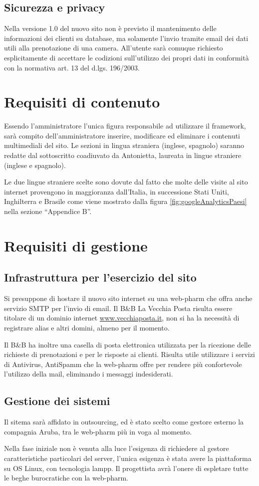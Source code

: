 \documentclass[a4paper,12pt,hidelinks]{report}
\begin{document}
\subsection{Sicurezza e privacy}
Nella versione 1.0 del nuovo sito non è previsto il mantenimento delle informazioni dei clienti su database, ma solamente l'invio tramite email dei dati utili alla prenotazione di una camera.
All'utente sarà comuque richiesto esplicitamente di accettare le codizioni sull'utilizzo dei propri dati in conformità con la normativa art. 13 del d.lgs. 196/2003.

\section{Requisiti di contenuto}
Essendo l'amministratore l'unica figura responsabile ad utilizzare il framework, sarà compito dell'amministratore inserire, modificare ed eliminare i contenuti multimediali del sito.
Le sezioni in lingua straniera (inglese, spagnolo) saranno redatte dal sottoscritto coadiuvato da Antonietta, laureata in lingue straniere (inglese e spagnolo).
\par Le due lingue straniere scelte sono dovute dal fatto che molte delle visite al sito internet provengono in maggioranza dall'Italia, in successione Stati Uniti, Inghilterra e Brasile come viene mostrato
dalla figura \ref{fig:googleAnalyticsPaesi} nella sezione ``Appendice B''.

\section{Requisiti di gestione}
  \subsection{Infrastruttura per l'esercizio del sito}
  Si presuppone di hostare il nuovo sito internet su una web-pharm che offra anche servizio SMTP per l'invio di email. Il B\&B La Vecchia Posta risulta essere titolare di un dominio internet \url{www.vecchiaposta.it},
  non si ha la necessità di registrare alias e altri domini, almeno per il momento.
  \par Il B\&B ha inoltre una casella di posta elettronica utilizzata per la ricezione delle richieste di prenotazioni e per le risposte ai clienti. Risulta utile utilizzare
  i servizi di Antivirus, AntiSpamm che la web-pharm offre per rendere più confortevole l'utilizzo della mail, eliminando i messaggi indesiderati.
  \subsection{Gestione dei sistemi}
  Il sitema sarà affidato in outsourcing, ed è stato scelto come gestore esterno la compagnia Aruba, tra le web-pharm più in voga al momento.
  \par Nella fase iniziale non è venuta alla luce l'esigenza di richiedere al gestore caratteristiche particolari del server, l'unica esigenza è stata avere la piattaforma su OS Linux, con tecnologia lampp.
  Il progettista avrà l'onere di espletare tutte le beghe burocratiche con la web-pharm.
\end{document}
